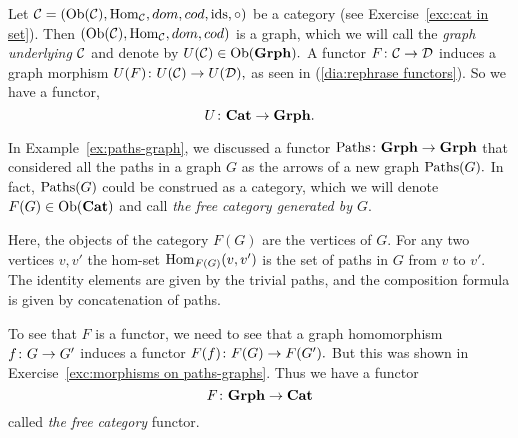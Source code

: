 \documentclass[../main/CT4S-EN-RU]{subfiles}
\begin{document}
\begin{proofRUS}
\end{proofRUS}

\begin{exampleENG}\label{ex:underlying graph}
Let $\mathcal{C}=(\operatorname{Ob}(\mathcal{C}),\operatorname{Hom}_\mathcal{C},dom,cod,\operatorname{ids},\circ)$ be a category (see Exercise~\ref{exc:cat in set}). Then $(\operatorname{Ob}(\mathcal{C}),\operatorname{Hom}_\mathcal{C},dom,cod)$ is a graph, which we will call the {\em graph underlying $\mathcal{C}$} and denote by $U(\mathcal{C})\in\operatorname{Ob}({\mathbf{Grph}}).$ A functor $F\colon\mathcal{C}\rightarrow\mathcal{D}$ induces a graph morphism $U(F)\colon U(\mathcal{C})\rightarrow U(\mathcal{D}),$ as seen in (\ref{dia:rephrase functors}). So we have a functor, $$U\colon{\mathbf{Cat}}\rightarrow{\mathbf{Grph}}.$$
\end{exampleENG}

\begin{exampleRUS}\label{ex:underlying graph}
\end{exampleRUS}

\begin{exampleENG}\label{ex:free category}
In Example~\ref{ex:paths-graph}, we discussed a functor $\operatorname{Paths}\colon{\mathbf{Grph}}\rightarrow{\mathbf{Grph}}$ that considered all the paths in a graph $G$ as the arrows of a new graph $\operatorname{Paths}(G).$ In fact, $\operatorname{Paths}(G)$ could be construed as a category, which we will denote $F(G)\in\operatorname{Ob}({\mathbf{Cat}})$ and call {\em the free category generated by $G$}. 

Here, the objects of the category $F(G)$ are the vertices of $G.$ For any two vertices $v,v'$ the hom-set $\operatorname{Hom}_{F(G)}(v,v')$ is the set of paths in $G$ from $v$ to $v'.$ The identity elements are given by the trivial paths, and the composition formula is given by concatenation of paths. 

To see that $F$ is a functor, we need to see that a graph homomorphism $f\colon G\rightarrow G'$ induces a functor $F(f)\colon F(G)\rightarrow F(G').$ But this was shown in Exercise~\ref{exc:morphisms on paths-graphs}. Thus we have a functor $$F\colon{\mathbf{Grph}}\rightarrow{\mathbf{Cat}}$$ called {\em the free category} functor.
\end{exampleENG}

\begin{exampleRUS}\label{ex:free category}
\end{exampleRUS}
\end{document}
